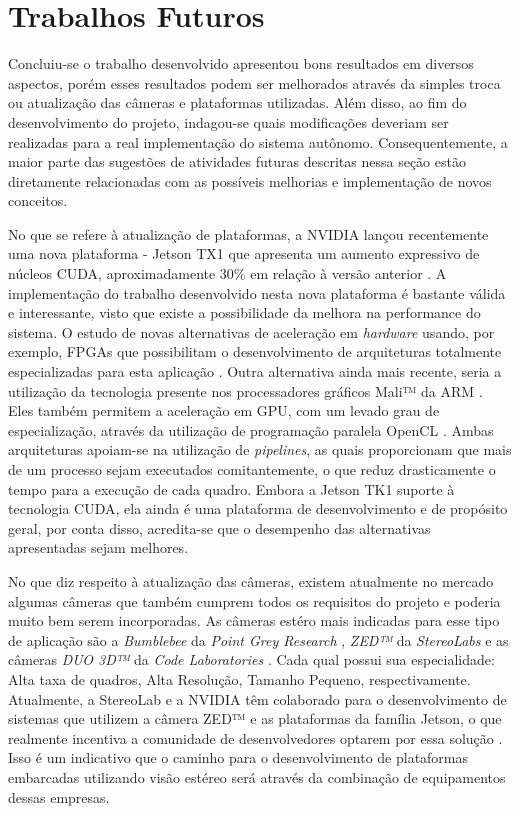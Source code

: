 \section{Trabalhos Futuros}

Concluiu-se o trabalho desenvolvido apresentou bons resultados em diversos aspectos, porém esses resultados podem ser melhorados através da simples troca ou atualização das câmeras e plataformas utilizadas. Além disso, ao fim do desenvolvimento do projeto, indagou-se quais modificações deveriam ser realizadas para a real implementação do sistema autônomo. Consequentemente, a maior parte das sugestões de atividades futuras descritas nessa seção estão diretamente relacionadas com as possíveis melhorias e implementação de novos conceitos.

No que se refere à atualização de plataformas, a NVIDIA lançou recentemente uma nova plataforma - Jetson TX1 que apresenta um aumento expressivo de núcleos CUDA, aproximadamente 30\% em relação à versão anterior \cite{JetsonTX1}. A implementação do trabalho desenvolvido nesta nova plataforma é bastante válida e interessante, visto que existe a possibilidade da melhora na performance do sistema. O estudo de novas alternativas de aceleração em \textit{hardware} usando, por exemplo, FPGAs que possibilitam o desenvolvimento de arquiteturas totalmente especializadas para esta aplicação \cite{Barry2015}. Outra alternativa ainda mais recente, seria a utilização da tecnologia presente nos processadores gráficos Mali™ da ARM \textregistered. Eles também permitem a aceleração em GPU, com um levado grau de especialização, através da utilização de programação paralela OpenCL \cite{StereoARM}. Ambas arquiteturas apoiam-se na utilização de \textit{pipelines}, as quais proporcionam que mais de um processo sejam executados comitantemente, o que reduz drasticamente o tempo para a execução de cada quadro. Embora a Jetson TK1 suporte à tecnologia CUDA, ela ainda é uma plataforma de desenvolvimento e de propósito geral, por conta disso, acredita-se que o desempenho das alternativas apresentadas sejam melhores.

No que diz respeito à atualização das câmeras, existem atualmente no mercado algumas câmeras que também cumprem todos os requisitos do projeto e poderia muito bem serem incorporadas. As câmeras estéro mais indicadas para esse tipo de aplicação são a \textit{Bumblebee} da \textit{Point Grey Research} \cite{bumblebee2}, \textit{ZED™} da \textit{StereoLabs} \cite{StereoLabsZED} e as câmeras \textit{DUO 3D™} da \textit{Code Laboratories} \cite{CodeLaboratoriesDUO}. Cada qual possui sua especialidade: Alta taxa de quadros, Alta Resolução, Tamanho Pequeno, respectivamente. Atualmente, a StereoLab e a NVIDIA têm colaborado para o desenvolvimento de sistemas que utilizem a câmera ZED™ e as plataformas da família Jetson, o que realmente incentiva a comunidade de desenvolvedores optarem por essa solução \cite{NVIDIAStereoLabsPartenership}. Isso é um indicativo que o caminho para o desenvolvimento de plataformas embarcadas utilizando visão estéreo será através da combinação de equipamentos dessas empresas.

